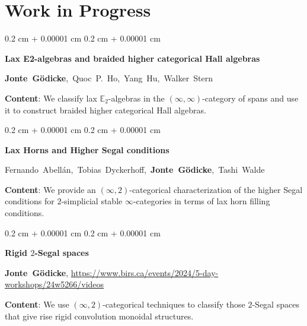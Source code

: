 \documentclass[10pt, letterpaper]{article}
\newenvironment{onecolentry}{
    \begin{adjustwidth}{
        0.2 cm + 0.00001 cm
    }{
        0.2 cm + 0.00001 cm
    }
}{
    \end{adjustwidth}
} %
\begin{document}
\section{Work in Progress}

\begin{onecolentry}
\textbf{Lax E2-algebras and braided higher categorical Hall
algebras}

                \vspace{0.10 cm}

                \mbox{\textbf{Jonte Gödicke}, Quoc P. Ho, Yang Hu, Walker Stern}
                \vspace{0.10 cm}
                
                \textbf{Content}: We classify lax $\mathbb{E}_{2}$-algebras in the $(\infty,\infty)$-category of spans and use it to construct braided higher categorical Hall algebras.
                \vspace{0.10 cm}    
\end{onecolentry}

\begin{onecolentry}
\textbf{Lax Horns and Higher Segal conditions}

                \vspace{0.10 cm}

                \mbox{Fernando Abell\'{a}n, Tobias Dyckerhoff, \textbf{Jonte Gödicke}, Tashi Walde}
                \vspace{0.10 cm}
                
                \textbf{Content}: We provide an $(\infty,2)$-categorical characterization of the higher Segal conditions for $2$-simplicial stable $\infty$-categories in terms of lax horn filling conditions.
                \vspace{0.10 cm}    
\end{onecolentry}


 \begin{onecolentry}
                \textbf{Rigid $2$-Segal spaces}

                \vspace{0.10 cm}

                \mbox{\textbf{Jonte Gödicke}}, \url{https://www.birs.ca/events/2024/5-day-workshops/24w5266/videos}

                \vspace{0.10 cm}
                
                \textbf{Content}: We use $(\infty,2)$-categorical techniques to classify those $2$-Segal spaces that give rise rigid convolution monoidal structures.
                \vspace{0.10 cm}

\end{onecolentry}
\end{document}

